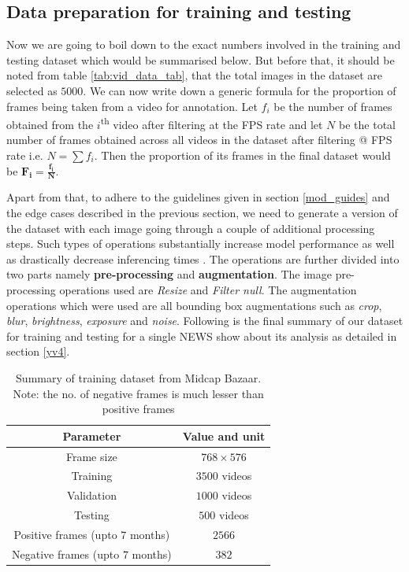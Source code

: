 \subsection{Data preparation for training and testing} \label{train_test}
Now we are going to boil down to the exact numbers involved in the
training and testing dataset which would be summarised below. But
before that, it should be noted from table \ref{tab:vid_data_tab},
that the total images in the dataset are selected as $5000$. We can
now write down a generic formula for the proportion of frames being
taken from a video for annotation. Let $f_i$ be the number of frames
obtained from the $i$\textsuperscript{th} video after filtering at
the FPS rate and let $N$ be the total number of frames obtained
across all videos in the dataset after filtering @ FPS rate i.e. $N =
\sum f_{i}$. Then the proportion of its frames in the final dataset
would be $\boldsymbol{F_{i} = \frac{f_{i}}{N}}$. \par

Apart from that, to adhere to the guidelines given in section
\ref{mod_guides} and the edge cases described in the previous
section, we need to generate a version of the dataset with each image
going through a couple of additional processing steps. Such types of
operations substantially increase model performance as well as
drastically decrease inferencing times \cite{Joseph2021}
\cite{Dwyer2020}. The operations are further divided into two parts
namely \textbf{pre-processing} and \textbf{augmentation}.  The image
pre-processing operations used are \textit{Resize} and \textit{Filter
null}. The augmentation operations which were used are all bounding
box augmentations such as \textit{crop}, \textit{blur},
\textit{brightness}, \textit{exposure} and \textit{noise}. Following
is the final summary of our dataset for training and testing for a
single NEWS show about its analysis as detailed in section \ref{yv4}.

\begin{table}[h]
  \def\arraystretch{1.5}
  \centering
  \caption{Summary of training dataset from Midcap Bazaar. Note: the
  no. of negative frames is much lesser than positive frames}
  \begin{tabular}{|c|c|}
    \hline
    Parameter                         & Value and unit   \\
    \hline
    Frame size                        & $768 \times 576$ \\
    \hline
    Training                          & $3500$ videos    \\
    \hline
    Validation                        & $1000$ videos    \\
    \hline
    Testing                           & $500$ videos     \\
    \hline
    Positive frames (upto $7$ months) & $2566$           \\
    \hline
    Negative frames (upto $7$ months) & $382$            \\
    \hline
  \end{tabular}
  \label{tab:vid_train}
\end{table}

